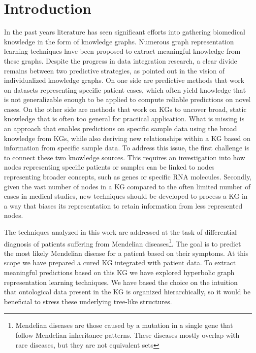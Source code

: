\chapter{Introduction}

In the past years literature has seen significant efforts into gathering biomedical knowledge in the form of knowledge graphs. Numerous graph representation learning techniques have been proposed to extract meaningful knowledge from these graphs. Despite the progress in data integration research, a clear divide remains between two predictive strategies, as pointed out in the vision of individualized knowledge graphs\cite{PingPeipei2017IKGA}. On one side are predictive methods that work on datasets representing specific patient cases, which often yield knowledge that is not generalizable enough to be applied to compute reliable predictions on novel cases. On the other side are methods that work on KGs to uncover broad, static knowledge that is often too general for practical application. What is missing is an approach that enables predictions on specific sample data using the broad knowledge from KGs, while also deriving new relationships within a KG based on information from specific sample data. To address this issue, the first challenge is to connect these two knowledge sources. This requires an investigation into how nodes representing specific patients or samples can be linked to nodes representing broader concepts, such as genes or specific RNA molecules. Secondly, given the vast number of nodes in a KG compared to the often limited number of cases in medical studies, new techniques should be developed to process a KG in a way that biases its representation to retain information from less represented nodes.

The techniques analyzed in this work are addressed at the task of differential diagnosis of patients suffering from Mendelian diseases\footnote{Mendelian diseases are those caused by a mutation in a single gene that follow Mendelian inheritance patterns. These diseases mostly overlap with rare diseases, but they are not equivalent sets}. The goal is to predict the most likely Mendelian disease for a patient based on their symptoms. At this scope we have prepared a cured KG integrated with patient data. To extract meaningful predictions based on this KG we have explored hyperbolic graph representation learning techniques. We have based the choice on the intuition that ontological data present in the KG is organized hierarchically, so it would be beneficial to stress these underlying tree-like structures.

